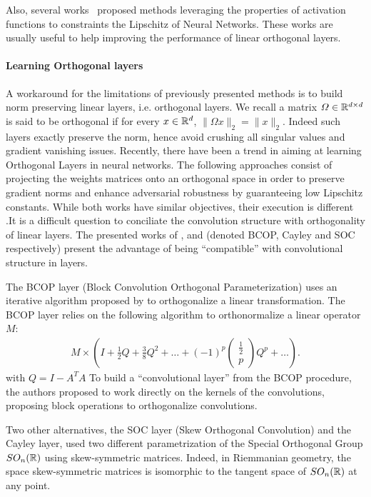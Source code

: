 Also, several works~\citep{anil2019sorting,singla2021householder,huang2021local} proposed methods leveraging the properties of activation functions to constraints the Lipschitz of Neural Networks. These works are usually useful to help  improving the performance of linear orthogonal layers.



\paragraph{Learning Orthogonal layers} A workaround for the limitations of previously presented methods is to build norm preserving linear layers, i.e. orthogonal layers. We recall a matrix $\Omega\in\mathbb{R}^{d\times d}$ is said to be orthogonal if for every $x\in\mathbb{R}^d$, $\lVert\Omega x\rVert_2 = \lVert x\rVert_2$. Indeed such layers exactly preserve the norm, hence avoid crushing all singular values and gradient vanishing issues. Recently, there have been a trend in aiming at learning Orthogonal Layers in neural networks.  The following approaches consist of projecting the weights matrices onto an orthogonal space in order to preserve gradient norms and enhance adversarial robustness by guaranteeing low Lipschitz constants. While both works have similar objectives, their execution is different .It is a difficult question to conciliate the convolution structure with orthogonality of linear layers. The presented works of \citet{li2019preventing}, \citet{trockman2021orthogonalizing} and \citet{skew2021sahil} (denoted BCOP, Cayley and SOC respectively) present the advantage of being ``compatible''  with convolutional structure in layers. 

The BCOP layer (Block Convolution Orthogonal Parameterization) uses an iterative algorithm proposed by \citet{bjorck1971iterative} to orthogonalize a linear transformation. The BCOP layer relies on the following algorithm to orthonormalize a linear operator $M$:
\begin{align*}
 M\times\left(I+\frac12Q+\frac38Q^2+\dots+(-1)^p\begin{pmatrix} \frac12\\p \end{pmatrix}
Q^p+\dots \right).
\end{align*}
with $Q = I-A^TA$ 
To build a ``convolutional layer'' from the BCOP procedure, the authors proposed to work directly on the kernels of the convolutions, proposing block operations to orthogonalize convolutions.

Two other alternatives, the SOC layer (Skew Orthogonal Convolution) and the Cayley layer, used two different parametrization of the Special Orthogonal Group $SO_n(\mathbb{R})$ using skew-symmetric matrices. Indeed, in Riemmanian geometry, the space skew-symmetric matrices is isomorphic to the tangent space of $SO_n(\mathbb{R})$ at any point. 

